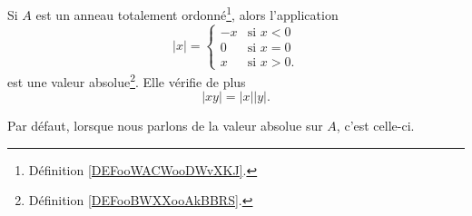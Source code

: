 \begin{propositionDef}	\label{DEFooJXKVooErANPh}
	Si \( A\) est un anneau totalement ordonné\footnote{Définition \ref{DEFooWACWooDWvXKJ}.}, alors l'application
	\begin{equation}      \label{EQooNONAooHLSERO}
		| x |=\begin{cases}
			-x & \text{si }x< 0  \\
			0  & \text{si }x= 0  \\
			x  & \text{si } x>0.
		\end{cases}
	\end{equation}
	est une valeur absolue\footnote{Définition \ref{DEFooBWXXooAkBBRS}.}. Elle vérifie de plus
	\begin{equation}		\label{EQooORNAooBYFeFk}
		| xy |=| x || y |.
	\end{equation}

	Par défaut, lorsque nous parlons de la valeur absolue sur \( A\), c'est celle-ci.
\end{propositionDef}

